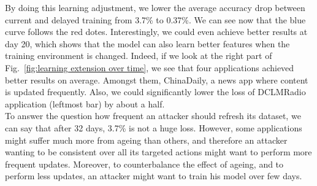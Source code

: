 \newpage

By doing this learning adjustment, we lower the average accuracy drop between current and delayed training from 3.7\% to 0.37\%. We can see now that the blue curve follows the red dotes. Interestingly, we could even achieve better results at day 20, which shows that the model can also learn better features when the training environment is changed. Indeed, if we look at the right part of Fig.~\ref{fig:learning extension over time}, we see that four applications achieved better results on average. Amongst them, ChinaDaily, a news app where content is updated frequently. Also, we could significantly lower the loss of DCLMRadio application (leftmost bar) by about a half. 
\\

To answer the question how frequent an attacker should refresh its dataset, we can say that after 32 days, 3.7\% is not a huge loss. However, some applications might suffer much more from ageing than others, and therefore an attacker wanting to be consistent over all its targeted actions might want to perform more frequent updates. Moreover, to counterbalance the effect of ageing, and to perform less updates, an attacker might want to train his model over few days.

